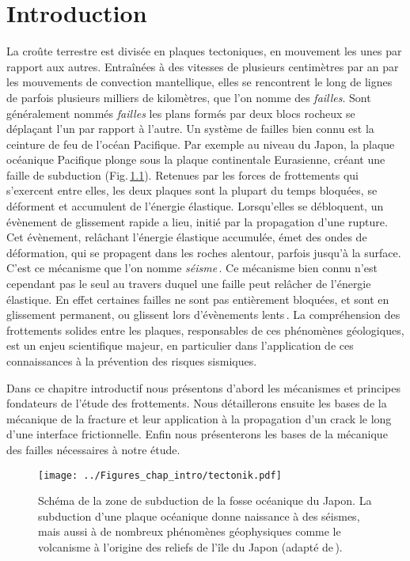 \chapter{Introduction}
\label{sec:chapintro}


La croûte terrestre est divisée en plaques tectoniques, en mouvement les unes par rapport aux autres. Entraînées à des vitesses de plusieurs centimètres par an par les mouvements de convection mantellique, elles se rencontrent le long de lignes de parfois plusieurs milliers de kilomètres, que l'on nomme des \textit{failles}. Sont généralement nommés \textit{failles} les plans formés par deux blocs rocheux se déplaçant l'un par rapport à l'autre. Un système de failles bien connu est la ceinture de feu de l'océan Pacifique. Par exemple au niveau du Japon, la plaque océanique Pacifique plonge sous la plaque continentale Eurasienne, créant une faille de subduction (Fig.\,\ref{fig:japon}). Retenues par les forces de frottements qui s'exercent entre elles, les deux plaques sont la plupart du temps bloquées, se déforment et accumulent de l'énergie élastique. Lorsqu'elles se débloquent, un évènement de glissement rapide a lieu, initié par la propagation d'une rupture. Cet évènement, relâchant l'énergie élastique accumulée, émet des ondes de déformation, qui se propagent dans les roches alentour, parfois jusqu'à la surface. C'est ce mécanisme que l'on nomme \textit{séisme}\,\cite{brace_stick-slip_1966}. Ce mécanisme bien connu n'est cependant pas le seul au travers duquel une faille peut relâcher de l'énergie élastique. En effet certaines failles ne sont pas entièrement bloquées, et sont en glissement permanent, ou glissent lors d'évènements lents\,\cite{rogers_episodic_2003}. La compréhension des frottements solides entre les plaques, responsables de ces phénomènes géologiques, est un enjeu scientifique majeur, en particulier dans l'application de ces connaissances à la prévention des risques sismiques.

Dans ce chapitre introductif nous présentons d'abord les mécanismes et principes fondateurs de l'étude des frottements. Nous détaillerons ensuite les bases de la mécanique de la fracture et leur application à la propagation d'un crack le long d'une interface frictionnelle. Enfin nous présenterons les bases de la mécanique des failles nécessaires à notre étude.




\begin{figure}[hbt]
\centering
\texttt{[image: ../Figures\_chap\_intro/tectonik.pdf]}
\caption[Schéma d'une zone de subduction]{Schéma de la zone de subduction de la fosse océanique du Japon. La subduction d'une plaque océanique donne naissance à des séismes, mais aussi à de nombreux phénomènes géophysiques comme le volcanisme à l'origine des reliefs de l'île du Japon (adapté de\,\cite{beig_friction_2006}).}
\label{fig:japon}
\end{figure}

